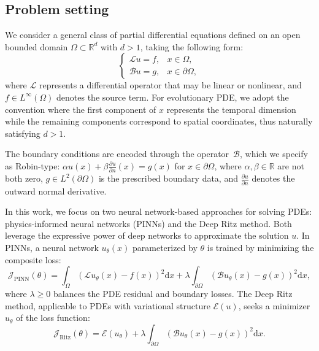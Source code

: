 \documentclass{article}
\renewcommand{\d}{\mathrm{d}}
\begin{document}
\subsection{Problem setting}\label{sec:problem}
We consider a general class of partial differential equations defined on an open bounded domain $\Omega \subset \mathbb{R}^{d}$ with $d > 1$, taking the following form:
\begin{equation}
    \begin{cases}
        \mathcal{L}u = f, & x \in \Omega, \\
        \mathcal{B}u = g, & x \in \partial\Omega,\label{eq:PDE}
    \end{cases}   
\end{equation}
where $\mathcal{L}$ represents a differential operator that may be linear or nonlinear, and $f\in L^{\infty}(\Omega)$ denotes the source term. 
For evolutionary PDE, we adopt the convention where the first component of $x$ represents the temporal dimension while the remaining components correspond to spatial coordinates, thus naturally satisfying $d > 1$.

The boundary conditions are encoded through the operator~$\mathcal{B}$, which we specify as Robin-type: $\alpha u(x) + \beta \frac{\partial u}{\partial n}(x) = g(x)$ for $x \in \partial\Omega$, where $\alpha, \beta \in \mathbb{R}$ are not both zero, $g \in L^2(\partial\Omega)$ is the prescribed boundary data, and $\frac{\partial u}{\partial n}$ denotes the outward normal derivative.

In this work, we focus on two neural network-based approaches for solving PDEs: physics-informed neural networks (PINNs) and the Deep Ritz method. 
Both leverage the expressive power of deep networks to approximate the solution \(u\).
In PINNs, a neural network \(u_\theta(x)\) parameterized by \(\theta\) is trained by minimizing the composite loss:
\begin{equation}
\mathcal{J}_{\text{PINN}}(\theta) = \int_{\Omega} \left( \mathcal{L} u_\theta(x) - f(x) \right)^2 \d{x} + \lambda  \int_{\partial\Omega}  \left( \mathcal{B}u_\theta(x) - g(x) \right)^2 \d{x}, \label{eq:PINN loss}
\end{equation}
where \(\lambda \geq 0\) balances the PDE residual and boundary losses.
The Deep Ritz method, applicable to PDEs with variational structure $\mathcal{E}(u)$, seeks a minimizer $u_{\theta}$ of the loss function:
\begin{equation}
\mathcal{J}_{\text{Ritz}}(\theta) = \mathcal{E}(u_\theta) + \lambda \int_{\partial\Omega} \left( \mathcal{B}u_\theta(x) - g(x) \right)^2 \d{x}. \label{eq:Ritz loss}
\end{equation}
\end{document}
